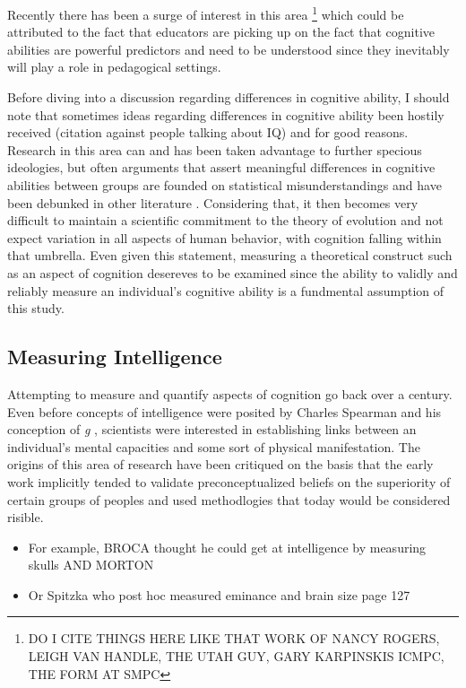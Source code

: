 \documentclass[]{book}
\providecommand{\tightlist}{%
  \setlength{\itemsep}{0pt}\setlength{\parskip}{0pt}}
\let\rmarkdownfootnote\footnote%
\def\footnote{\protect\rmarkdownfootnote}
\begin{document}
Recently there has been a surge of interest in this area \footnote{DO I CITE THINGS HERE LIKE THAT WORK OF NANCY ROGERS, LEIGH VAN HANDLE, THE UTAH GUY, GARY KARPINSKIS ICMPC, THE FORM AT SMPC} which could be attributed to the fact that educators are picking up on the fact that cognitive abilities are powerful predictors and need to be understood since they inevitably will play a role in pedagogical settings.

Before diving into a discussion regarding differences in cognitive ability, I should note that sometimes ideas regarding differences in cognitive ability been hostily received (citation against people talking about IQ) and for good reasons.
Research in this area can and has been taken advantage to further specious ideologies, but often arguments that assert meaningful differences in cognitive abilities between groups are founded on statistical misunderstandings and have been debunked in other literature \citep{gouldMismeasureMan1996}.
Considering that, it then becomes very difficult to maintain a scientific commitment to the theory of evolution \citep{darwinOriginSpecies1859} and not expect variation in all aspects of human behavior, with cognition falling within that umbrella.
Even given this statement, measuring a theoretical construct such as an aspect of cognition desereves to be examined since the ability to validly and reliably measure an individual's cognitive ability is a fundmental assumption of this study.

\hypertarget{measuring-intelligence}{%
\subsection{Measuring Intelligence}\label{measuring-intelligence}}

Attempting to measure and quantify aspects of cognition go back over a century.
Even before concepts of intelligence were posited by Charles Spearman and his conception of \emph{g} \citep{spearmanGeneralIntelligenceObjectively1904}, scientists were interested in establishing links between an individual's mental capacities and some sort of physical manifestation.
The origins of this area of research have been critiqued on the basis that the early work implicitly tended to validate preconceptualized beliefs on the superiority of certain groups of peoples and used methodlogies that today would be considered risible.

\begin{itemize}
\tightlist
\item
  For example, BROCA thought he could get at intelligence by measuring skulls AND MORTON
\item
  Or Spitzka who post hoc measured eminance and brain size page 127
\end{itemize}
\end{document}
